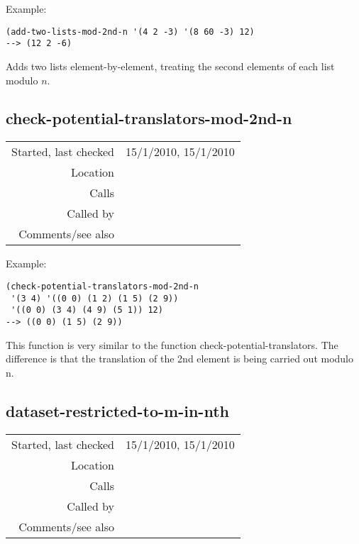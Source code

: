 \vspace{0.5cm}
\noindent Example:
\begin{verbatim}
(add-two-lists-mod-2nd-n '(4 2 -3) '(8 60 -3) 12)
--> (12 2 -6)
\end{verbatim}

\noindent Adds two lists element-by-element, treating
the second elements of each list modulo $n$.


\subsection*{check-potential-translators-mod-2nd-n}\label{fun:check-potential-translators-mod-2nd-n}

\vspace{0.3cm}
\begin{tabular}{r|p{8cm}}
Started, last checked & 15/1/2010, 15/1/2010 \\
Location & \nameref{sec:structural-induction-mod} \\
Calls & \nameref{fun:read-from-file} \\
Called by & \nameref{fun:translators-of-pattern-in-dataset-mod-2nd-n} \\
Comments/see also & \nameref{fun:check-potential-translators}
\end{tabular}

\vspace{0.5cm}
\noindent Example:
\begin{verbatim}
(check-potential-translators-mod-2nd-n
 '(3 4) '((0 0) (1 2) (1 5) (2 9))
 '((0 0) (3 4) (4 9) (5 1)) 12)
--> ((0 0) (1 5) (2 9))
\end{verbatim}

\noindent This function is very similar to the
function check-potential-translators. The difference
is that the translation of the 2nd element is being
carried out modulo n.


\subsection*{dataset-restricted-to-m-in-nth}\label{fun:dataset-restricted-to-m-in-nth}

\vspace{0.3cm}
\begin{tabular}{r|p{8cm}}
Started, last checked & 15/1/2010, 15/1/2010 \\
Location & \nameref{sec:structural-induction-mod} \\
Calls & \\
Called by & \\
Comments/see also &
\end{tabular}

